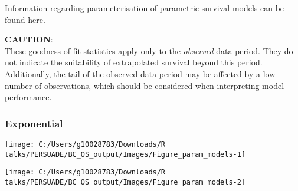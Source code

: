 \documentclass[
]{article}
\begin{document}
Information regarding parameterisation of parametric survival models can
be found
\href{https://devinincerti.com/code/survival-distributions.html}{here}.

\textbf{CAUTION}:\\
These goodness-of-fit statistics apply only to the \emph{observed} data
period. They do not indicate the suitability of extrapolated survival
beyond this period. Additionally, the tail of the observed data period
may be affected by a low number of observations, which should be
considered when interpreting model performance.

\clearpage

\begin{table}[H]
\centering
\caption{\label{tab:Table_2}Goodness of fit statistics}
\centering
{}
\end{table}

\clearpage

\clearpage

\subsubsection{Exponential}\label{exponential}

\begin{flushleft}\texttt{[image: C:/Users/g10028783/Downloads/R talks/PERSUADE/BC\_OS\_output/Images/Figure\_param\_models-1]} \end{flushleft}

\begin{flushleft}\texttt{[image: C:/Users/g10028783/Downloads/R talks/PERSUADE/BC\_OS\_output/Images/Figure\_param\_models-2]} \end{flushleft}
\end{document}
